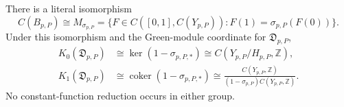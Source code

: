 \begin{lemma}
\label{lem:unit-fibre-mapping-torus-k-groups}
There is a literal isomorphism
\begin{equation}
 C(B_{p,P})\cong M_{\sigma_{p,P}}
 =\{F\in C([0,1],C(Y_{p,P})):F(1)=\sigma_{p,P}(F(0))\}.
 \label{eq:unit-fibre-mapping-torus-isomorphism}
\end{equation}
Under this isomorphism and the Green-module coordinate for
\(\mathfrak D_{p,P}\),
\begin{align}
 K_0(\mathfrak D_{p,P})
 &\cong
 \ker(1-\sigma_{p,P,*})
 \cong C(Y_{p,P}/H_{p,P},\mathbb Z),
 \label{eq:finite-edge-K0-invariants}\\
 K_1(\mathfrak D_{p,P})
 &\cong
 \operatorname{coker}(1-\sigma_{p,P,*})
 \cong
 \frac{C(Y_{p,P},\mathbb Z)}
 {(1-\sigma_{p,P})C(Y_{p,P},\mathbb Z)}.
 \label{eq:finite-edge-K1-coinvariants}
\end{align}
No constant-function reduction occurs in either group.
\end{lemma}

